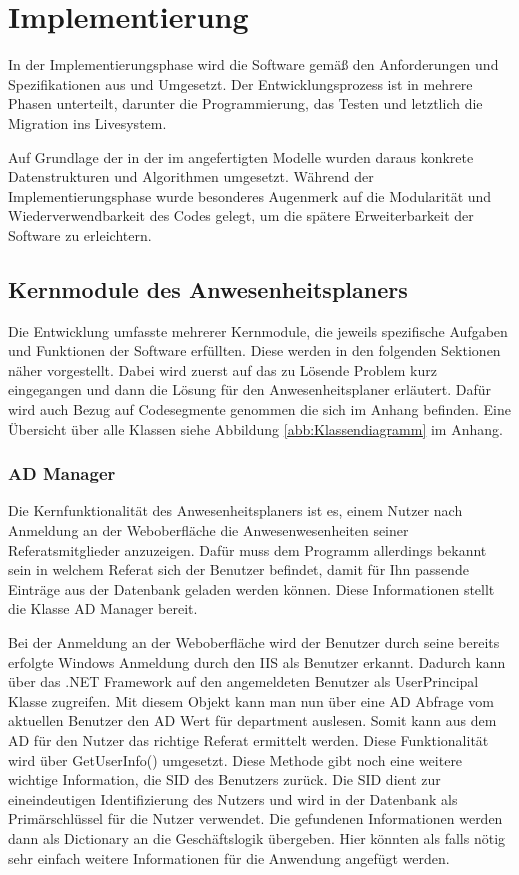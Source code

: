 \section{Implementierung}
\label{sec:Implementierung}
In der Implementierungsphase wird die Software gemäß den Anforderungen und Spezifikationen aus  und  Umgesetzt. Der Entwicklungsprozess ist in mehrere Phasen unterteilt, darunter die Programmierung, das Testen und letztlich die Migration ins Livesystem.

Auf Grundlage der in der im  angefertigten Modelle wurden daraus konkrete Datenstrukturen und Algorithmen umgesetzt. Während der Implementierungsphase wurde besonderes Augenmerk auf die Modularität und Wiederverwendbarkeit des Codes gelegt, um die spätere Erweiterbarkeit der Software zu erleichtern.

\subsection{Kernmodule des Anwesenheitsplaners}
\label{sec:Kernmodule}
Die Entwicklung umfasste mehrerer Kernmodule, die jeweils spezifische Aufgaben und Funktionen der Software erfüllten. Diese werden in den folgenden Sektionen näher vorgestellt. Dabei wird zuerst auf das zu Lösende Problem kurz eingegangen und dann die Lösung für den Anwesenheitsplaner erläutert. Dafür wird \ggfs auch Bezug auf Codesegmente genommen die sich im Anhang befinden. Eine Übersicht über alle Klassen siehe Abbildung \ref{abb:Klassendiagramm} im Anhang.

\subsubsection{AD Manager}
\label{sec:ADManager}
Die Kernfunktionalität des Anwesenheitsplaners ist es, einem Nutzer nach Anmeldung an der Weboberfläche die Anwesenwesenheiten seiner Referatsmitglieder anzuzeigen. Dafür muss dem Programm allerdings bekannt sein in welchem Referat sich der Benutzer befindet, damit für Ihn passende Einträge aus der Datenbank geladen werden können. Diese Informationen stellt die Klasse AD Manager bereit.

Bei der Anmeldung an der Weboberfläche wird der Benutzer durch seine bereits erfolgte Windows Anmeldung durch den IIS als Benutzer erkannt. Dadurch kann über das .NET Framework auf den angemeldeten Benutzer als UserPrincipal Klasse zugreifen. Mit diesem Objekt kann man nun über eine AD Abfrage vom aktuellen Benutzer den AD Wert für department auslesen. Somit kann aus dem AD für den Nutzer das richtige Referat ermittelt werden. Diese Funktionalität wird über GetUserInfo() umgesetzt. Diese Methode gibt noch eine weitere wichtige Information, die SID des Benutzers zurück. Die SID dient zur eineindeutigen Identifizierung des Nutzers und wird in der Datenbank als Primärschlüssel für die Nutzer verwendet. Die gefundenen Informationen werden dann als Dictionary an die Geschäftslogik übergeben. Hier könnten als falls nötig sehr einfach weitere Informationen für die Anwendung angefügt werden.

